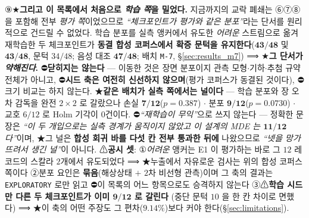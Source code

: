 \documentclass[11pt]{report}
\numberwithin{equation}{chapter}
\numberwithin{figure}{chapter}
\numberwithin{table}{chapter}
\begin{document}
\begin{enumerate}
        ⑨★\textbf{그리고 이 목록에서 처음으로 \emph{학습 쪽}을 밀었다.} 지금까지의 교락
        폐쇄는 ⑥⑦⑧ 을 포함해 전부 \emph{평가 쪽}이었으므로 \emph{``체크포인트가 평가와 같은
        분포''}라는 단서를 원리적으로 건드릴 수 없었다. 학습 분포를 실측 앵커에서 유도한
        \emph{어려운} 스트림으로 옮겨 재학습한 두 체크포인트가 \textbf{동결 합성 코퍼스에서
        확증 문턱을 유지한다}($\mathbf{43/48}$ 및 $\mathbf{43/48}$, 문턱 $34/48$; 음성 대조
        $\mathbf{47/48}$; 배치 \texttt{M-7}, \S\ref{sec:results_m7}) ⟹ ★\textbf{그 단서가
        \emph{약해진다}.} ⛔\textbf{닫히지는 않는다} --- 이동한 것은 장면 분포이지 관측
        모형$\cdot$기하$\cdot$추첨 규약 전체가 아니고, ⛔\textbf{시드 축은 여전히 신선하지
        않으며}(평가 코퍼스가 동결된 것이다), ⛔크기 비교는 하지 않는다.
        ★\textbf{같은 배치가 실측 쪽에서는 널이다} --- 학습 분포와 장 오차 감독을 완전
        $2\times2$ 로 갈랐으나 손실 $\mathbf{7/12}$($p = 0.387$) $\cdot$ 분포
        $\mathbf{9/12}$($p = \mathbf{0.0730}$) $\cdot$ 교호 $6/12$ 로 Holm 기각이 $0$건이다.
        ⛔\emph{``재학습이 무익''}으로 쓰지 않는다 --- 정확한 문장은 \emph{``이 두 개입으로는
        실측 경계가 움직이지 않았고 이 설계의 MDE 는 $\mathbf{11/12}$ 다''}이며,
        ★그 널은 \textbf{합성 회귀 바를 다섯 칸 전부 통과한 뒤에} 나왔으므로
        \emph{``넷을 망가뜨려서 생긴 널''}이 아니다.
        ⚠\textbf{공시 셋}: ①\emph{어려운} 앵커는 E1 이 평가하는 바로 그 $12$ 레코드의 스칼라
        $2$개에서 유도되었다 ⟹ ★누출에서 자유로운 검사는 위의 합성 코퍼스 쪽이다
        ②분포 요인은 \textbf{묶음}(해상상태 $+$ $2$차 비선형 관측)이며 그 축의 결과는
        \texttt{EXPLORATORY} 로만 읽고 ⛔이 목록의 어느 항목으로도 승격하지 않는다
        ③⚠\textbf{학습 시드만 다른 두 체크포인트가 이미 $\mathbf{9/12}$ 로 갈린다}
        (중단 문턱 $10$ 을 한 칸 차이로 면했다) ⟹ ★이 축의 어떤 주장도 그 편차($9.14\%$)보다
        커야 한다(\S\ref{sec:limitations}).

\end{enumerate}
\end{document}
